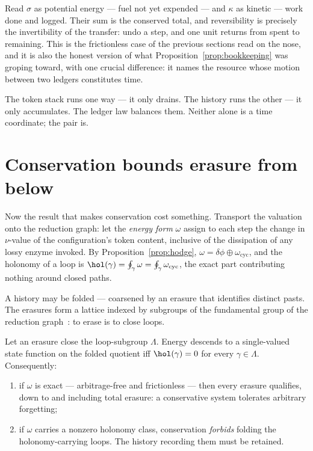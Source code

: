 Read $\sigma$ as potential energy --- fuel not yet expended --- and
$\kappa$ as kinetic --- work done and logged.  Their sum is the conserved
total, and reversibility is precisely the invertibility of the transfer:
undo a step, and one unit returns from spent to remaining.  This is the
frictionless case of the previous sections read on the nose, and it is
also the honest version of what Proposition~\ref{prop:bookkeeping} was
groping toward, with one crucial difference: it names the resource whose
motion between two ledgers constitutes time.

\begin{remark}
The token stack runs one way --- it only drains.  The history runs the
other --- it only accumulates.  The ledger law balances them.  Neither
alone is a time coordinate; the pair is.
\end{remark}

\section{Conservation bounds erasure from below}
\label{sec:erasurebound}

Now the result that makes conservation cost something.  Transport the
valuation onto the reduction graph: let the \emph{energy form} $\omega$
assign to each step the change in $\nu$-value of the configuration's token
content, inclusive of the dissipation of any lossy enzyme invoked.  By
Proposition~\ref{prop:hodge}, $\omega = \delta\phi \oplus
\omega_{\mathrm{cyc}}$, and the holonomy of a loop is
$\hol(\gamma) = \oint_\gamma \omega = \oint_\gamma \omega_{\mathrm{cyc}}$,
the exact part contributing nothing around closed paths.

A history may be folded --- coarsened by an erasure that identifies
distinct pasts.  The erasures form a lattice indexed by subgroups of the
fundamental group of the reduction graph~\cite{History}: to erase is to
close loops.

\begin{theorem}
\label{thm:price}
Let an erasure close the loop-subgroup $\Lambda$.  Energy descends to a
single-valued state function on the folded quotient iff
$\hol(\gamma) = 0$ for every $\gamma \in \Lambda$.  Consequently:
\begin{enumerate}[label=\textup{(\roman*)}]
  \item if $\omega$ is exact --- arbitrage-free and frictionless --- then
        every erasure qualifies, down to and including total erasure: a
        conservative system tolerates arbitrary forgetting;
  \item if $\omega$ carries a nonzero holonomy class, conservation
        \emph{forbids} folding the holonomy-carrying loops.  The history
        recording them must be retained.
\end{enumerate}
\end{theorem}

